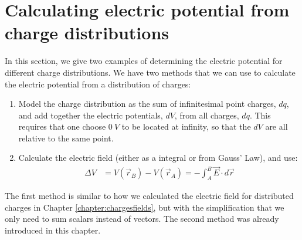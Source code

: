 \section{Calculating electric potential from charge distributions}
In this section, we give two examples of determining the electric potential for different charge distributions. We have two methods that we can use to calculate the electric potential from a distribution of charges:
\begin{enumerate}
\item Model the charge distribution as the sum of infinitesimal point charges, $dq$, and add together the electric potentials, $dV$, from all charges, $dq$. This requires that one choose $\SI{0}{V}$ to be located at infinity, so that the $dV$ are all relative to the same point.
\item Calculate the electric field (either as a integral or from Gauss' Law), and use:
\begin{align*}
\Delta V &=V(\vec r_B)-V(\vec r_A)=-\int_A^B  \vec E\cdot d\vec r
\end{align*}
\end{enumerate}
The first method is similar to how we calculated the electric field for distributed charges in Chapter \ref{chapter:chargesfields}, but with the simplification that we only need to sum scalars instead of vectors. The second method was already introduced in this chapter.
